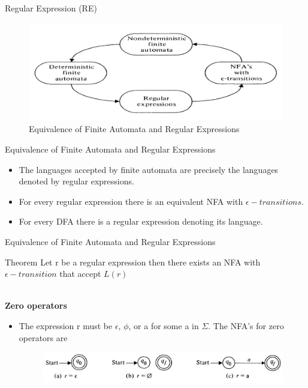 \documentclass{beamer}
\begin{document}
\begin{frame}{Regular Expression (RE)}
	\begin{figure}
		\includegraphics[scale=.5]{img2/m1}
		\caption{Equivalence of Finite Automata and Regular Expressions}
	\end{figure}
\end{frame}
\begin{frame}{Equivalence of Finite Automata and Regular Expressions}
	\begin{itemize}
		\item The languages accepted by finite automata are precisely the 
		languages denoted by regular expressions. 
		\item For every regular expression there is an equivalent NFA with $\epsilon -
		transitions.$
		\item For every DFA there is a regular expression denoting its language.
	\end{itemize}
\end{frame}
\begin{frame}{Equivalence of Finite Automata and Regular Expressions}
	\begin{block}{Theorem}
		Let r be a regular expression then there exists an NFA with $\epsilon- transition$ that accept $L(r)$ 
	\end{block}
\proofname\\ 
\textbf{Zero operators}
	\begin{itemize}
		\item The expression r must be $\epsilon$, $\phi$, or a for some a in $\Sigma$. The NFA’s for zero operators are
		\begin{figure}
			\includegraphics[scale=.3]{img2/m2}
		\end{figure}
	\end{itemize}
\end{frame}
\end{document}
